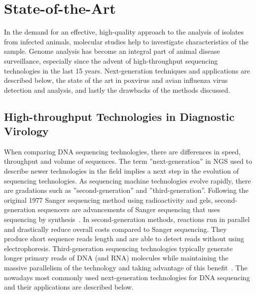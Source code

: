 \chapter{State-of-the-Art}\label{chap:state-art}
In the demand for an effective, high-quality approach to the analysis of isolates from infected animals, molecular studies help to investigate characteristics of the sample. Genome analysis has become an integral part of animal disease surveillance, especially since the advent of high-throughput sequencing technologies in the last 15 years. Next-generation techniques and applications are described below, the state of the art in poxvirus and avian influenza virus detection and analysis, and lastly the drawbacks of the methods discussed.

\section{High-throughput Technologies in Diagnostic Virology}
When comparing DNA sequencing technologies, there are differences in speed, throughput and volume of sequences. The term ''next-generation'' in NGS used to describe newer technologies in the field implies a next step in the evolution of sequencing technologies. As sequencing machine technologies evolve rapidly, there are gradations such as ''second-generation'' and ''third-generation''. Following the original 1977 Sanger sequencing method using radioactivity and gels, second-generation sequencers are advancements of Sanger sequencing that uses sequencing by synthesis~\cite{mardis2008next}. In second-generation methods, reactions run in parallel and drastically reduce overall costs compared to Sanger sequencing. They produce short sequence reads length and are able to detect reads without using electrophoresis.
Third-generation sequencing technologies typically generate longer primary reads of DNA (and RNA) molecules while maintaining the massive parallelism of the technology and taking advantage of this benefit~\cite{slatko2018overview}. The nowadays most commonly used next-generation technologies for DNA sequencing and their applications are described below.

